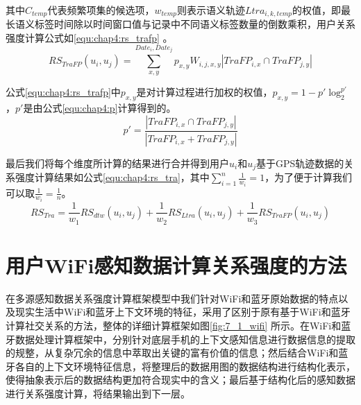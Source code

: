 \par 其中$C_{temp}$代表频繁项集的候选项，$w_{temp}$则表示语义轨迹$Ltra_{i,k,temp}$的权值，即最长语义标签时间除以时间窗口值与记录中不同语义标签数量的倒数乘积，用户关系强度计算公式如\ref{equ:chap4:rs_trafp} 。
\begin{equation}
\label{equ:chap4:rs_trafp}
RS_{TraFP}(u_{i},u_{j})=\sum_{x ,y }^{ Date_{i}, Date_{j}} p_{x,y} W_{i,j,x,y} \left |TraFP_{i,x} \cap TraFP_{j,y}   \right |
\end{equation}
\par 公式\ref{equ:chap4:rs_trafp}中$p_{x,y}$是对计算过程进行加权的权值，$p_{x,y}=1-{p}'\log_{2}^{{p}'}$，${p}'$是由公式\ref{equ:chap4:p}计算得到的。
\begin{equation}
\label{equ:chap4:p}
{p}'=\frac{\left |TraFP_{i,x} \cap TraFP_{j,y}   \right |}{\left |TraFP_{i,x} + TraFP_{j,y}   \right |}
\end{equation}

\par  最后我们将每个维度所计算的结果进行合并得到用户$u_{i}$和$u_{j}$基于GPS轨迹数据的关系强度计算结果如公式\ref{equ:chap4:rs_tra}，其中$ \sum_{i=1}^{n}\frac{1}{w_{i}}=1$，为了便于计算我们可以取$\frac{1}{w_{i}}=\frac{1}{n}$。
\begin{equation}
\label{equ:chap4:rs_tra}
RS_{Tra}=\frac{1}{w_{1}} RS_{dtw}(u_{i},u_{j})+\frac{1}{w_{2}}RS_{Ltra}(u_{i},u_{j})+\frac{1}{w_{3}}RS_{TraFP}(u_{i},u_{j})
\end{equation}
\section{用户WiFi感知数据计算关系强度的方法}
\label{sec:wifi_input}
在多源感知数据关系强度计算框架模型中我们针对WiFi和蓝牙原始数据的特点以及现实生活中WiFi和蓝牙上下文环境的特征，采用了区别于原有基于WiFi和蓝牙计算社交关系的方法，整体的详细计算框架如图\ref{fig:7_1_wifi} 所示。在WiFi和蓝牙数据处理计算框架中，分别针对底层手机的上下文感知信息进行数据信息的提取的规整，从复杂冗余的信息中萃取出关键的富有价值的信息；然后结合WiFi和蓝牙各自的上下文环境特征信息，将整理后的数据用图的数据结构进行结构化表示，使得抽象表示后的数据结构更加符合现实中的含义；最后基于结构化后的感知数据进行关系强度计算，将结果输出到下一层。

